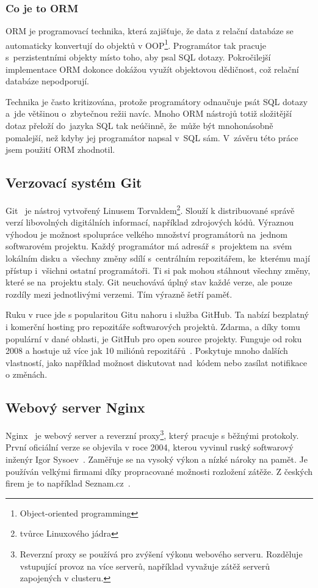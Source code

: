 \subsubsection*{Co je to ORM}

ORM je programovací technika, která zajišťuje, že data z relační databáze
se automaticky konvertují do objektů v OOP\footnote{Object-oriented programming}. Programátor tak pracuje s~perzistentními
objekty místo toho, aby psal SQL dotazy. Pokročilejší implementace ORM dokonce dokážou využít objektovou dědičnost, což relační databáze nepodporují.

Technika je často kritizována, protože programátory odnaučuje psát SQL dotazy a~jde většinou o~zbytečnou režii navíc.
Mnoho ORM nástrojů totiž složitější dotaz přeloží do~jazyka SQL tak neúčinně,
že~může být mnohonásobně pomalejší, než kdyby jej programátor napsal v~SQL sám.
V~závěru této práce jsem použití ORM zhodnotil.

\subsection{Verzovací systém Git}

Git~\cite{git} je nástroj vytvořený Linusem Torvaldem\footnote{tvůrce Linuxového jádra}.
Slouží k distribuované správě verzí libovolných digitálních informací, například zdrojových kódů.
Výraznou výhodou je možnost spolupráce velkého množství programátorů na~jednom softwarovém projektu. 
Každý programátor má adresář s~projektem na~svém lokálním disku a~všechny změny sdílí s~centrálním repozitářem,
ke~kterému mají přístup i~všichni ostatní programátoři. Ti si pak mohou stáhnout všechny změny,
které se na~projektu staly. Git neuchovává úplný stav každé verze, ale pouze rozdíly mezi jednotlivými verzemi.
Tím výrazně šetří paměť.  

Ruku v ruce jde s popularitou Gitu nahoru i služba GitHub.
Ta nabízí bezplatný i komerční hosting pro repozitáře softwarových projektů.
Zdarma, a díky tomu populární v dané oblasti, je GitHub pro open source projekty.
Funguje od roku 2008 a hostuje už více jak 10 miliónů repozitářů~\cite{git_about}.
Poskytuje mnoho dalších vlastností, jako například možnost diskutovat nad~kódem
nebo zasílat notifikace o změnách.

\subsection{Webový server Nginx}

Nginx~\cite{nginx} je webový server a reverzní proxy\footnote{Reverzní proxy se používá pro zvýšení výkonu webového serveru.
Rozděluje vstupující provoz na více serverů, například vyvažuje zátěž serverů zapojených v clusteru.}, který pracuje s běžnými protokoly.
První oficiální verze se objevila v roce 2004, kterou vyvinul ruský softwarový inženýr Igor Sysoev~\cite{nginx_changes}.
Zaměřuje se na vysoký výkon a nízké nároky na pamět. Je používán velkými firmami
díky propracované možnosti rozložení zátěže. Z českých firem je to například Seznam.cz~\cite{nginx_seznam}.

